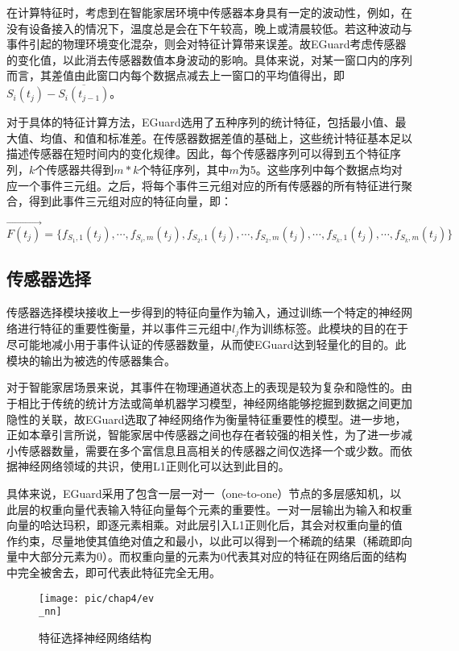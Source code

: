 在计算特征时，考虑到在智能家居环境中传感器本身具有一定的波动性，例如，在没有设备接入的情况下，温度总是会在下午较高，晚上或清晨较低。若这种波动与事件引起的物理环境变化混杂，则会对特征计算带来误差。故EGuard考虑传感器的变化值，以此消去传感器数值本身波动的影响。具体来说，对某一窗口内的序列而言，其差值由此窗口内每个数据点减去上一窗口的平均值得出，即$S_i(t_j)-\overline{S_i(t_{j-1})}$。

对于具体的特征计算方法，EGuard选用了五种序列的统计特征，包括最小值、最大值、均值、和值和标准差。在传感器数据差值的基础上，这些统计特征基本足以描述传感器在短时间内的变化规律。因此，每个传感器序列可以得到五个特征序列，$k$个传感器共得到$m*k$个特征序列，其中$m$为5。这些序列中每个数据点均对应一个事件三元组。之后，将每个事件三元组对应的所有传感器的所有特征进行聚合，得到此事件三元组对应的特征向量，即：

\begin{equation}
	\vec{F(t_j)}=\{f_{S_1,1} (t_j),\cdots,f_{S_i,m} (t_j),f_{S_2,1} (t_j),\cdots,f_{S_2,m} (t_j),\cdots,f_{S_k,1} (t_j),\cdots,f_{S_k,m} (t_j)\}
\end{equation}

\subsection{传感器选择}

传感器选择模块接收上一步得到的特征向量作为输入，通过训练一个特定的神经网络进行特征的重要性衡量，并以事件三元组中$l_j$作为训练标签。此模块的目的在于尽可能地减小用于事件认证的传感器数量，从而使EGuard达到轻量化的目的。此模块的输出为被选的传感器集合。

对于智能家居场景来说，其事件在物理通道状态上的表现是较为复杂和隐性的。由于相比于传统的统计方法或简单机器学习模型，神经网络能够挖掘到数据之间更加隐性的关联，故EGuard选取了神经网络作为衡量特征重要性的模型。进一步地，正如本章引言所说，智能家居中传感器之间也存在者较强的相关性，为了进一步减小传感器数量，需要在多个富信息且高相关的传感器之间仅选择一个或少数。而依据神经网络领域的共识，使用L1正则化可以达到此目的。

具体来说，EGuard采用了包含一层一对一（one-to-one）节点的多层感知机，以此层的权重向量代表输入特征向量每个元素的重要性。一对一层输出为输入和权重向量的哈达玛积，即逐元素相乘。对此层引入L1正则化后，其会对权重向量的值作约束，尽量地使其值绝对值之和最小，以此可以得到一个稀疏的结果（稀疏即向量中大部分元素为0）。而权重向量的元素为0代表其对应的特征在网络后面的结构中完全被舍去，即可代表此特征完全无用。

\begin{figure}[!h]
	\centering
	\texttt{[image: pic/chap4/ev\\\_nn]}
	\caption{特征选择神经网络结构}
	\label{fig:ev_nn}
\end{figure}

